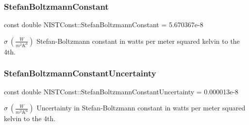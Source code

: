 \subsubsection{\texorpdfstring{Stefan\+Boltzmann\+Constant}{StefanBoltzmannConstant}}
{\footnotesize\ttfamily const double N\+I\+S\+T\+Const\+::\+Stefan\+Boltzmann\+Constant = 5.\+670367e-\/8}

$\sigma \ (\frac{W}{m^2 K^4})$ Stefan-\/\+Boltzmann constant in watts per meter squared kelvin to the 4th. \mbox{\label{group___stefan_boltzmann_constant_ga98b40b4f7ea1cd358d0a140bf8f6973c}} 
\subsubsection{\texorpdfstring{Stefan\+Boltzmann\+Constant\+Uncertainty}{StefanBoltzmannConstantUncertainty}}
{\footnotesize\ttfamily const double N\+I\+S\+T\+Const\+::\+Stefan\+Boltzmann\+Constant\+Uncertainty = 0.\+000013e-\/8}

$\sigma \ (\frac{W}{m^2 K^4})$ Uncertainty in Stefan-\/\+Boltzmann constant in watts per meter squared kelvin to the 4th. 